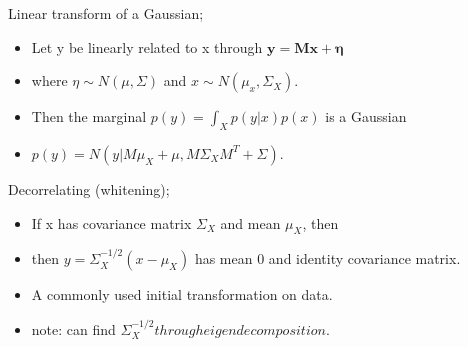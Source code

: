 \documentclass{article}
\begin{document}
Linear transform of a Gaussian; \begin{itemize} \item Let y be linearly related to x through $\mathbf{y = Mx + \eta}$ \item where $\eta \sim N(\mu, \Sigma)$ and $x\sim N(\mu_x, \Sigma_X)$. \item Then the marginal $p(y)=\int_X p(y|x)p(x)$ is a Gaussian \item $p(y) = N(y|M\mu_X + \mu, M\Sigma_XM^T+\Sigma)$. \end{itemize}

Decorrelating (whitening); \begin{itemize} \item If x has covariance matrix $\Sigma_X$ and mean $\mu_X$, then  \item then $y=\Sigma_X^{-1/2}(x-\mu_X)$ has mean 0 and identity covariance matrix. \item A commonly used initial transformation on data. \item note: can find $\Sigma_X^{-1/2} through eigendecomposition.$ \end{itemize}
\end{document}
